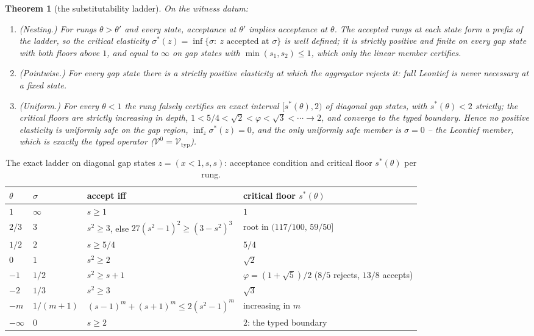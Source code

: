 \documentclass[preprint,11pt,authoryear]{elsarticle}
\newtheorem{theorem}{Theorem}
\theoremstyle{definition}
\theoremstyle{remark}
\newcommand{\Vtyp}{\mathcal{V}_{\mathrm{typ}}}
\begin{document}
\begin{theorem}[the substitutability ladder]\label{thm:ladder}
On the witness datum:
\begin{enumerate}[label=\textup{(\roman*)},leftmargin=2em]
\item \textup{(Nesting.)} For rungs $\theta>\theta'$ and every state, acceptance at $\theta'$ implies acceptance at $\theta$. The accepted rungs at each state form a prefix of the ladder, so the \emph{critical elasticity} $\sigma^*(z)=\inf\{\sigma:\ z\text{ accepted at }\sigma\}$ is well defined; it is strictly positive and finite on every gap state with both floors above $1$, and equal to $\infty$ on gap states with $\min(s_1,s_2)\le1$, which only the linear member certifies.
\item \textup{(Pointwise.)} For every gap state there is a strictly positive elasticity at which the aggregator rejects it: full Leontief is never necessary at a fixed state.
\item \textup{(Uniform.)} For every $\theta<1$ the rung falsely certifies an exact interval $[s^*(\theta),2)$ of diagonal gap states, with $s^*(\theta)<2$ strictly; the critical floors are strictly increasing in depth, $1<5/4<\sqrt2<\varphi<\sqrt3<\cdots\to2$, and converge to the typed boundary. Hence no positive elasticity is uniformly safe on the gap region, $\inf_z\sigma^*(z)=0$, and the only uniformly safe member is $\sigma=0$ -- the Leontief member, which is exactly the typed operator ($\mathcal V^{0}=\Vtyp$).
\end{enumerate}
\end{theorem}

\begin{table}[!htbp]
\centering\small
\caption{The exact ladder on diagonal gap states $z=(x<1,s,s)$: acceptance condition and critical floor $s^*(\theta)$ per rung.}
\label{tab:ladder}
\begin{tabularx}{\textwidth}{@{}ll>{\raggedright\arraybackslash}p{}X@{}}
\toprule
$\theta$ & $\sigma$ & accept iff & critical floor $s^*(\theta)$ \\
\midrule
$1$ & $\infty$ & $s\ge1$ & $1$ \\
$2/3$ & $3$ & $s^2\ge3$, else $27(s^2-1)^2\ge(3-s^2)^3$ & root in $(117/100,\,59/50]$ \\
$1/2$ & $2$ & $s\ge5/4$ & $5/4$ \\
$0$ & $1$ & $s^2\ge2$ & $\sqrt2$ \\
$-1$ & $1/2$ & $s^2\ge s+1$ & $\varphi=(1+\sqrt5)/2$ ($8/5$ rejects, $13/8$ accepts) \\
$-2$ & $1/3$ & $s^2\ge3$ & $\sqrt3$ \\
$-m$ & $1/(m+1)$ & $(s-1)^m+(s+1)^m\le2(s^2-1)^m$ & increasing in $m$ \\
$-\infty$ & $0$ & $s\ge2$ & $2$: the typed boundary \\
\bottomrule
\end{tabularx}
\end{table}
\end{document}
